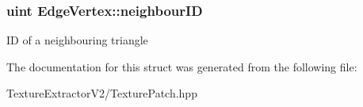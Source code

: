 \subsubsection[{neighbour\+I\+D}]{\setlength{\rightskip}{0pt plus 5cm}uint Edge\+Vertex\+::neighbour\+I\+D}\label{struct_edge_vertex_a0383800c9299c747dc5ddbf4b397806d}
I\+D of a neighbouring triangle 

The documentation for this struct was generated from the following file\+:\begin{DoxyCompactItemize}
\item 
Texture\+Extractor\+V2/Texture\+Patch.\+hpp\end{DoxyCompactItemize}
